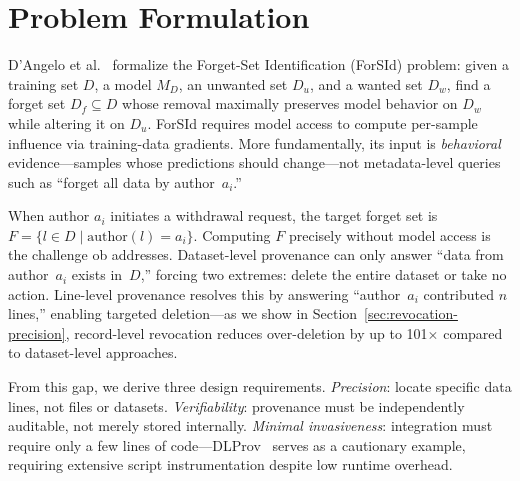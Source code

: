 \section{Problem Formulation}

D'Angelo et al.~\cite{dangelo2025forsid} formalize the Forget-Set Identification (ForSId) problem: given a training set $D$, a model $M_D$, an unwanted set $D_u$, and a wanted set $D_w$, find a forget set $D_f \subseteq D$ whose removal maximally preserves model behavior on $D_w$ while altering it on $D_u$. ForSId requires model access to compute per-sample influence via training-data gradients. More fundamentally, its input is \emph{behavioral} evidence---samples whose predictions should change---not metadata-level queries such as ``forget all data by author~$a_i$.''

When author $a_i$ initiates a withdrawal request, the target forget set is $F = \{l \in D \mid \text{author}(l) = a_i\}$. Computing $F$ precisely without model access is the challenge ob addresses. Dataset-level provenance can only answer ``data from author~$a_i$ exists in~$D$,'' forcing two extremes: delete the entire dataset or take no action. Line-level provenance resolves this by answering ``author~$a_i$ contributed $n$ lines,'' enabling targeted deletion---as we show in Section~\ref{sec:revocation-precision}, record-level revocation reduces over-deletion by up to 101$\times$ compared to dataset-level approaches.

From this gap, we derive three design requirements. \emph{Precision}: locate specific data lines, not files or datasets. \emph{Verifiability}: provenance must be independently auditable, not merely stored internally. \emph{Minimal invasiveness}: integration must require only a few lines of code---DLProv~\cite{pina2025dlprov} serves as a cautionary example, requiring extensive script instrumentation despite low runtime overhead.
